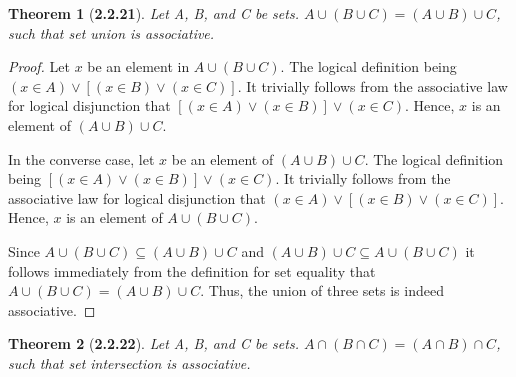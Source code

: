 \documentclass[a4paper, 12pt]{article}
\theoremstyle{plain}
\newtheorem*{theorem*}{Theorem}
\begin{document}
\begin{theorem*}[\textbf{2.2.21}]
    Let A, B, and C be sets. $A \cup (B \cup C) = (A \cup B) \cup C$, such that set union is 
    associative.
\end{theorem*}

\begin{proof}
    Let $x$ be an element in $A \cup (B \cup C)$. The logical definition being \newline 
    $(x \in A) \lor [(x \in B) \lor (x \in C)]$. It trivially follows from the associative 
    law for logical disjunction that $[(x \in A) \lor (x \in B)] \lor (x \in C)$. Hence, $x$ 
    is an element of $(A \cup B) \cup C$.
    
    In the converse case, let $x$ be an element of $(A \cup B) \cup C$. The logical definition 
    being $[(x \in A) \lor (x \in B)] \lor (x \in C)$. It trivially follows from the associative 
    law for logical disjunction that $(x \in A) \lor [(x \in B) \lor (x \in C)]$. Hence, $x$ is 
    an element of $A \cup (B \cup C) $.
    
    Since $A \cup (B \cup C) \subseteq (A \cup B) \cup C$ and 
    $(A \cup B) \cup C \subseteq A \cup (B \cup C)$ it follows immediately from the definition 
    for set equality that \newline $A \cup (B \cup C) = (A \cup B) \cup C$. Thus, the union of 
    three sets is indeed associative.
\end{proof}

\pagebreak


\begin{theorem*}[\textbf{2.2.22}]
    Let A, B, and C be sets. $A \cap (B \cap C) = (A \cap B) \cap C$, such that set 
    intersection is associative.
\end{theorem*}
\end{document}
